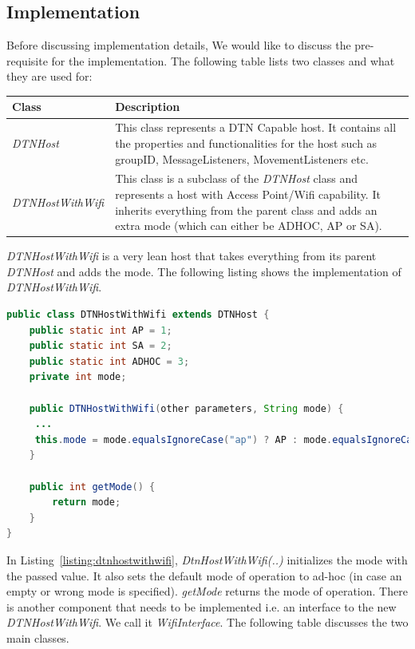 \subsection{Implementation}
Before discussing implementation details, We would like to discuss the pre-requisite for the implementation. The following table lists two classes and what they are used for:
	\begin{center}
	    \begin{tabular}{ | l | p{10.5cm} |}
    		\hline
    		\textbf{Class} & \textbf{Description} \\ \hline
    		\textit{DTNHost} & This class represents a DTN Capable host. It contains all the properties and functionalities for the host such as groupID, MessageListeners, MovementListeners etc. \\ \hline
    		\textit{DTNHostWithWifi} & This class is a subclass of the \textit{DTNHost} class and represents a host with Access Point/Wifi capability. It inherits everything from the parent class and adds an extra mode (which can either be ADHOC, AP or SA). \\ \hline
    	\end{tabular}
	\end{center}
\vspace{5mm}
\textit{DTNHostWithWifi} is a very lean host that takes everything from its parent \textit{DTNHost} and adds the mode. The following listing shows the implementation of \textit{DTNHostWithWifi}.\newline
\begin{lstlisting}[language=java]
public class DTNHostWithWifi extends DTNHost {
	public static int AP = 1;
	public static int SA = 2;
	public static int ADHOC = 3;
	private int mode;

	public DTNHostWithWifi(other parameters, String mode) {
	 ...
	 this.mode = mode.equalsIgnoreCase("ap") ? AP : mode.equalsIgnoreCase("sa") ? SA : ADHOC;
	}

	public int getMode() {
		return mode;
	}
}
\end{lstlisting}
\label{listing:dtnhostwithwifi}
\vspace{4mm}
In Listing~\ref{listing:dtnhostwithwifi}, \textit{DtnHostWithWifi(..)} initializes the mode with the passed value. It also sets the default mode of operation to ad-hoc (in case an empty or wrong mode is specified). \textit{getMode} returns the mode of operation.\newline
\newline
There is another component that needs to be implemented i.e. an interface to the new \textit{DTNHostWithWifi}. We call it \textit{WifiInterface}. The following table discusses the two main classes.

